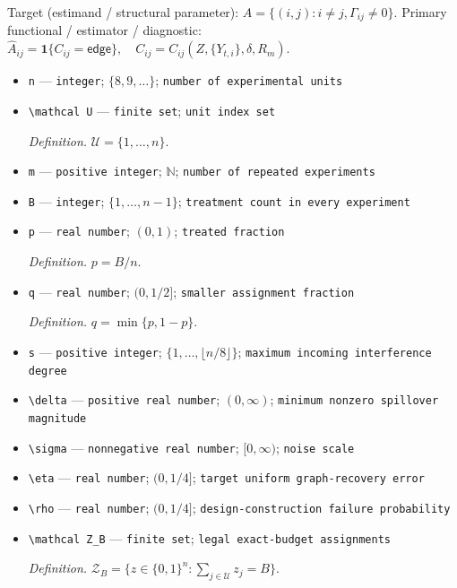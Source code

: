 \documentclass{article}
\begin{document}
Target (estimand / structural parameter): \(A=\{(i,j):i\ne j,\Gamma_{ij}\ne0\}\).
Primary functional / estimator / diagnostic: \(\widehat A_{ij}=\mathbf 1\{C_{ij}=\mathsf{edge}\},\quad C_{ij}=C_{ij}(Z,\{Y_{t,i}\},\delta,R_m)\).
\begin{itemize}
  \item \texttt{n} --- \texttt{integer}; \(\{8,9,\ldots\}\); \texttt{number of experimental units}
  \item \texttt{\textbackslash{}\allowbreak{}mathcal U} --- \texttt{finite set}; \texttt{unit index set}
  \par\smallskip\noindent\emph{Definition.} \(\mathcal U=\{1,\ldots,n\}\).
  \item \texttt{m} --- \texttt{positive integer}; \(\mathbb N\); \texttt{number of repeated experiments}
  \item \texttt{B} --- \texttt{integer}; \(\{1,\ldots,n-1\}\); \texttt{treatment count in every experiment}
  \item \texttt{p} --- \texttt{real number}; \((0,1)\); \texttt{treated fraction}
  \par\smallskip\noindent\emph{Definition.} \(p=B/n\).
  \item \texttt{q} --- \texttt{real number}; \((0,1/2]\); \texttt{smaller assignment fraction}
  \par\smallskip\noindent\emph{Definition.} \(q=\min\{p,1-p\}\).
  \item \texttt{s} --- \texttt{positive integer}; \(\{1,\ldots,\lfloor n/8\rfloor\}\); \texttt{maximum incoming interference degree}
  \item \texttt{\textbackslash{}\allowbreak{}delta} --- \texttt{positive real number}; \((0,\infty)\); \texttt{minimum nonzero spillover magnitude}
  \item \texttt{\textbackslash{}\allowbreak{}sigma} --- \texttt{nonnegative real number}; \([0,\infty)\); \texttt{noise scale}
  \item \texttt{\textbackslash{}\allowbreak{}eta} --- \texttt{real number}; \((0,1/4]\); \texttt{target uniform graph-\allowbreak{}recovery error}
  \item \texttt{\textbackslash{}\allowbreak{}rho} --- \texttt{real number}; \((0,1/4]\); \texttt{design-\allowbreak{}construction failure probability}
  \item \texttt{\textbackslash{}\allowbreak{}mathcal Z\_\allowbreak{}B} --- \texttt{finite set}; \texttt{legal exact-\allowbreak{}budget assignments}
  \par\smallskip\noindent\emph{Definition.} \(\mathcal Z_B=\{z\in\{0,1\}^n:\sum_{j\in\mathcal U}z_j=B\}\).

\end{itemize}
\end{document}
